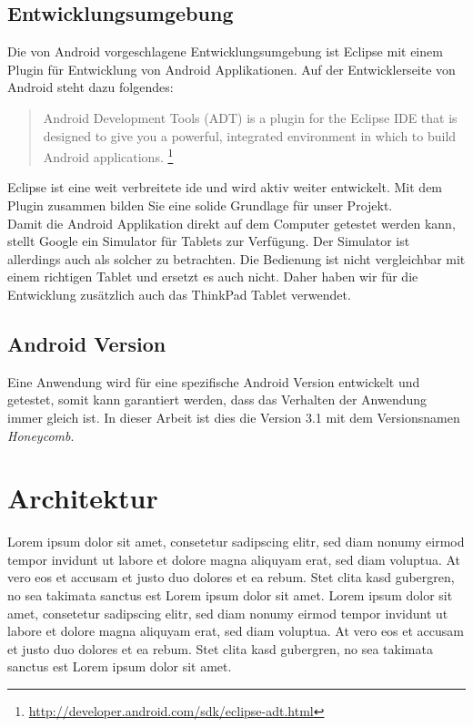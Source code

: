 \subsection{Entwicklungsumgebung}
Die von Android vorgeschlagene Entwicklungsumgebung ist Eclipse mit einem Plugin für Entwicklung von Android Applikationen. Auf der Entwicklerseite von Android steht dazu folgendes:
\begin{quote}
Android Development Tools (ADT) is a plugin for the Eclipse IDE that is designed to give you a powerful, integrated environment in which to build Android applications.
\footnote{\url{http://developer.android.com/sdk/eclipse-adt.html}}
\end{quote}
Eclipse ist eine weit verbreitete \gls{ide} und wird aktiv weiter entwickelt. Mit dem Plugin zusammen bilden Sie eine solide Grundlage für unser Projekt.
\\
Damit die Android Applikation direkt auf dem Computer getestet werden kann, stellt Google ein Simulator für Tablets zur Verfügung. Der Simulator ist allerdings auch als solcher zu betrachten. Die Bedienung ist nicht vergleichbar mit einem richtigen Tablet und ersetzt es auch nicht. Daher haben wir für die Entwicklung zusätzlich auch das ThinkPad Tablet verwendet.

\subsection{Android Version}
Eine Anwendung wird für eine spezifische Android Version entwickelt und getestet, somit kann garantiert werden, dass das Verhalten der Anwendung  immer gleich ist. In dieser Arbeit ist dies die Version 3.1 mit dem Versionsnamen \textit{Honeycomb}.

\section{Architektur}
Lorem ipsum dolor sit amet, consetetur sadipscing elitr, sed diam nonumy eirmod tempor invidunt ut labore et dolore magna aliquyam erat, sed diam voluptua. At vero eos et accusam et justo duo dolores et ea rebum. Stet clita kasd gubergren, no sea takimata sanctus est Lorem ipsum dolor sit amet. Lorem ipsum dolor sit amet, consetetur sadipscing elitr, sed diam nonumy eirmod tempor invidunt ut labore et dolore magna aliquyam erat, sed diam voluptua. At vero eos et accusam et justo duo dolores et ea rebum. Stet clita kasd gubergren, no sea takimata sanctus est Lorem ipsum dolor sit amet.

